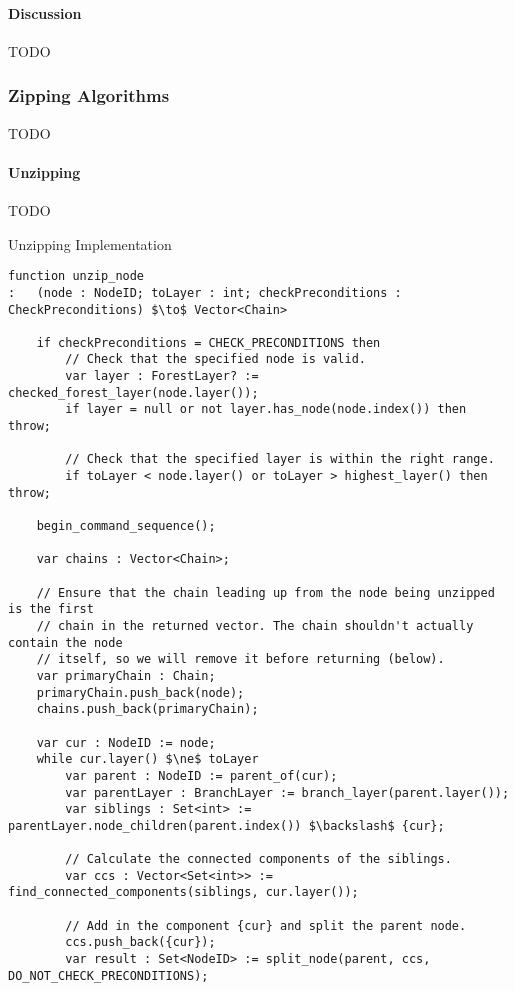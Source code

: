\paragraph{Discussion}

TODO

\subsubsection{Zipping Algorithms}

TODO

\paragraph{Unzipping}

TODO

\begin{stulisting}[p]
\caption{Unzipping Implementation}
\label{code:ipfs-forest-unzipnode}
\begin{lstlisting}[style=Default]
function unzip_node
:	(node : NodeID; toLayer : int; checkPreconditions : CheckPreconditions) $\to$ Vector<Chain>

	if checkPreconditions = CHECK_PRECONDITIONS then
		// Check that the specified node is valid.
		var layer : ForestLayer? := checked_forest_layer(node.layer());
		if layer = null or not layer.has_node(node.index()) then throw;

		// Check that the specified layer is within the right range.
		if toLayer < node.layer() or toLayer > highest_layer() then throw;

	begin_command_sequence();

	var chains : Vector<Chain>;

	// Ensure that the chain leading up from the node being unzipped is the first
	// chain in the returned vector. The chain shouldn't actually contain the node
	// itself, so we will remove it before returning (below).
	var primaryChain : Chain;
	primaryChain.push_back(node);
	chains.push_back(primaryChain);

	var cur : NodeID := node;
	while cur.layer() $\ne$ toLayer
		var parent : NodeID := parent_of(cur);
		var parentLayer : BranchLayer := branch_layer(parent.layer());
		var siblings : Set<int> := parentLayer.node_children(parent.index()) $\backslash$ {cur};

		// Calculate the connected components of the siblings.
		var ccs : Vector<Set<int>> := find_connected_components(siblings, cur.layer());

		// Add in the component {cur} and split the parent node.
		ccs.push_back({cur});
		var result : Set<NodeID> := split_node(parent, ccs, DO_NOT_CHECK_PRECONDITIONS);


\end{lstlisting}
\end{stulisting}
